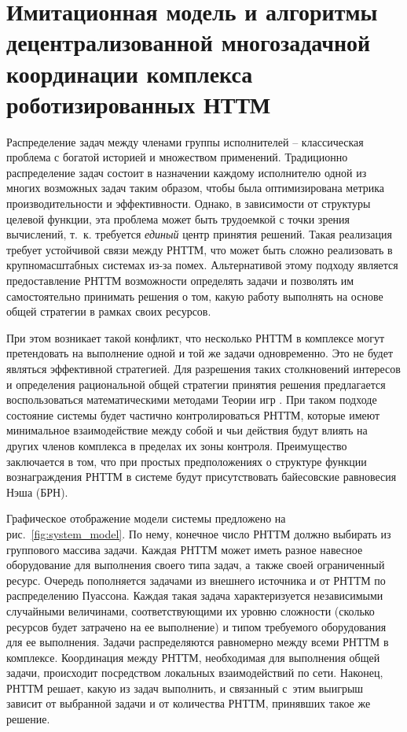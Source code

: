 \chapter{Имитационная модель и алгоритмы децентрализованной многозадачной координации комплекса роботизированных НТТМ}\label{ch:ch2}

Распределение задач между членами группы исполнителей -- классическая проблема с богатой историей и множеством применений. Традиционно распределение задач состоит в назначении каждому исполнителю одной из многих возможных задач таким образом, чтобы была оптимизирована метрика производительности и эффективности. Однако, в зависимости от структуры целевой функции, эта проблема может быть трудоемкой с точки зрения вычислений, т.\ к. требуется \textit{единый} центр принятия решений. Такая реализация требует устойчивой связи между РНТТМ, что может быть сложно реализовать в крупномасштабных системах из-за помех. Альтернативой этому подходу является предоставление РНТТМ возможности определять задачи и позволять им самостоятельно принимать решения о том, какую работу выполнять на основе общей стратегии в рамках своих ресурсов.

При этом возникает такой конфликт, что несколько РНТТМ в комплексе могут претендовать на выполнение одной и той же задачи одновременно. Это не будет являться эффективной стратегией. Для разрешения таких столкновений интересов и определения рациональной общей стратегии принятия решения предлагается воспользоваться математическими методами Теории игр \cite{GlobalGames, GlobalGames2, GlobalGamesRus, GlobalGamesRus2}. При таком подходе состояние системы будет частично контролироваться РНТТМ, которые имеют минимальное взаимодействие между собой и чьи действия будут влиять на других членов комплекса в пределах их зоны контроля. Преимущество заключается в том, что при простых предположениях о структуре функции вознаграждения РНТТМ в системе будут присутствовать байесовские равновесия Нэша (БРН).


Графическое отображение модели системы предложено на рис.\ \cref{fig:system_model}. По нему, конечное число РНТТМ должно выбирать из группового массива задачи. Каждая РНТТМ может иметь разное навесное оборудование для выполнения своего типа задач, а~также своей ограниченный ресурс. Очередь пополняется задачами из внешнего источника и от РНТТМ по распределению Пуассона. Каждая такая задача характеризуется независимыми случайными величинами, соответствующими их уровню сложности (сколько ресурсов будет затрачено на ее выполнение) и типом требуемого оборудования для ее выполнения. Задачи распределяются равномерно между всеми РНТТМ в комплексе. Координация между РНТТМ, необходимая для выполнения общей задачи, происходит посредством локальных взаимодействий по сети. Наконец, РНТТМ решает, какую из задач выполнить, и связанный с~этим выигрыш зависит от выбранной задачи и от количества РНТТМ, принявших такое же решение.

